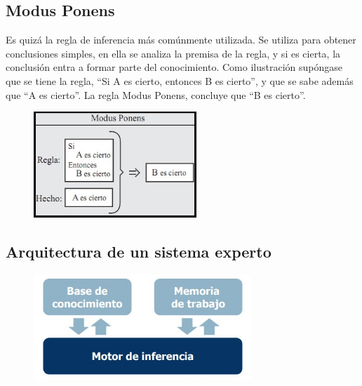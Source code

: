 \documentclass[conference]{IEEEtran}
\begin{document}
\subsection{Modus Ponens}
Es quizá la regla de inferencia más comúnmente utilizada. Se utiliza para obtener conclusiones simples, en ella se analiza la premisa de la regla, y si es cierta, la conclusión entra a formar parte del conocimiento. Como ilustración supóngase que se tiene la regla, “Si A es cierto, entonces B es cierto”, y que se sabe además que “A es cierto”. La regla Modus Ponens, concluye que “B es cierto”.
\\
\begin{figure}[h!]
    \includegraphics[height=4cm]{modus.jpg}
\end{figure}

\subsection{Arquitectura de un sistema experto}
\begin{figure}[h!]
    \includegraphics[height=4cm]{arquitectura.jpg}
\end{figure}
\end{document}
